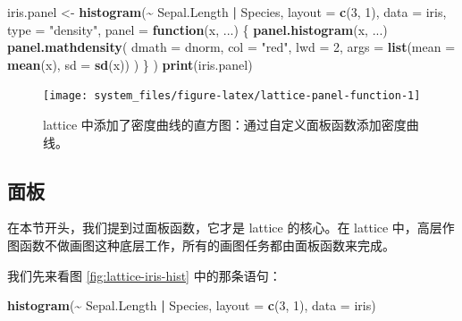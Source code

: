 \documentclass[
  b5paper,
  UTF8,twoside]{book}
\newenvironment{Shaded}{\begin{snugshade}}{\end{snugshade}}
\newcommand{\AttributeTok}[1]{\textcolor[rgb]{0.13,0.29,0.53}{#1}}
\newcommand{\ControlFlowTok}[1]{\textcolor[rgb]{0.13,0.29,0.53}{\textbf{#1}}}
\newcommand{\DecValTok}[1]{\textcolor[rgb]{0.00,0.00,0.81}{#1}}
\newcommand{\FunctionTok}[1]{\textcolor[rgb]{0.13,0.29,0.53}{\textbf{#1}}}
\newcommand{\NormalTok}[1]{#1}
\newcommand{\OtherTok}[1]{\textcolor[rgb]{0.56,0.35,0.01}{#1}}
\newcommand{\SpecialCharTok}[1]{\textcolor[rgb]{0.81,0.36,0.00}{\textbf{#1}}}
\newcommand{\StringTok}[1]{\textcolor[rgb]{0.31,0.60,0.02}{#1}}
\begin{document}
\begin{Shaded}
\begin{Highlighting}[]
\NormalTok{iris.panel }\OtherTok{\textless{}{-}} \FunctionTok{histogram}\NormalTok{(}\SpecialCharTok{\textasciitilde{}}\NormalTok{ Sepal.Length }\SpecialCharTok{|}\NormalTok{ Species,}
  \AttributeTok{layout =} \FunctionTok{c}\NormalTok{(}\DecValTok{3}\NormalTok{, }\DecValTok{1}\NormalTok{), }\AttributeTok{data =}\NormalTok{ iris, }\AttributeTok{type =} \StringTok{"density"}\NormalTok{,}
  \AttributeTok{panel =} \ControlFlowTok{function}\NormalTok{(x, ...) \{}
    \FunctionTok{panel.histogram}\NormalTok{(x, ...)}
    \FunctionTok{panel.mathdensity}\NormalTok{(}
      \AttributeTok{dmath =}\NormalTok{ dnorm, }\AttributeTok{col =} \StringTok{"red"}\NormalTok{,}
      \AttributeTok{lwd =} \DecValTok{2}\NormalTok{, }\AttributeTok{args =} \FunctionTok{list}\NormalTok{(}\AttributeTok{mean =} \FunctionTok{mean}\NormalTok{(x), }\AttributeTok{sd =} \FunctionTok{sd}\NormalTok{(x))}
\NormalTok{    )}
\NormalTok{  \}}
\NormalTok{)}
\FunctionTok{print}\NormalTok{(iris.panel)}
\end{Highlighting}
\end{Shaded}

\begin{figure}

{\centering \texttt{[image: system\_files/figure-latex/lattice-panel-function-1]} 

}

\caption[lattice 中添加了密度曲线的直方图]{lattice 中添加了密度曲线的直方图：通过自定义面板函数添加密度曲线。}\label{fig:lattice-panel-function}
\end{figure}



\subsection{面板}\label{ux9762ux677f}

在本节开头，我们提到过面板函数，它才是 lattice 的核心。在 lattice 中，高层作图函数不做画图这种底层工作，所有的画图任务都由面板函数来完成。

我们先来看图 \ref{fig:lattice-iris-hist} 中的那条语句：

\begin{Shaded}
\begin{Highlighting}[]
\FunctionTok{histogram}\NormalTok{(}\SpecialCharTok{\textasciitilde{}}\NormalTok{ Sepal.Length }\SpecialCharTok{|}\NormalTok{ Species, }\AttributeTok{layout =} \FunctionTok{c}\NormalTok{(}\DecValTok{3}\NormalTok{, }\DecValTok{1}\NormalTok{), }\AttributeTok{data =}\NormalTok{ iris)}
\end{Highlighting}
\end{Shaded}
\end{document}
